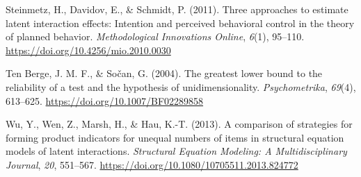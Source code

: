 \documentclass[
  man]{apa6}
\newlength{\cslhangindent}
\newlength{\cslentryspacingunit} %
\newenvironment{CSLReferences}[2] %
 {%
  \setlength{\parindent}{0pt}
  \ifodd #1
  \let\oldpar\par
  \def\par{\hangindent=\cslhangindent\oldpar}
  \fi
  \setlength{\parskip}{#2\cslentryspacingunit}
 }%
 {}
\begin{document}
\begin{CSLReferences}{1}{0}
\leavevmode{}%
Steinmetz, H., Davidov, E., \& Schmidt, P. (2011). Three approaches to estimate latent interaction effects: {Intention} and perceived behavioral control in the theory of planned behavior. \emph{Methodological Innovations Online}, \emph{6}(1), 95--110. \url{https://doi.org/10.4256/mio.2010.0030}

\leavevmode{}%
Ten Berge, J. M. F., \& Sočan, G. (2004). The greatest lower bound to the reliability of a test and the hypothesis of unidimensionality. \emph{Psychometrika}, \emph{69}(4), 613--625. \url{https://doi.org/10.1007/BF02289858}

\leavevmode{}%
Wu, Y., Wen, Z., Marsh, H., \& Hau, K.-T. (2013). A comparison of strategies for forming product indicators for unequal numbers of items in structural equation models of latent interactions. \emph{Structural Equation Modeling: A Multidisciplinary Journal}, \emph{20}, 551--567. \url{https://doi.org/10.1080/10705511.2013.824772}

\end{CSLReferences}
\end{document}
